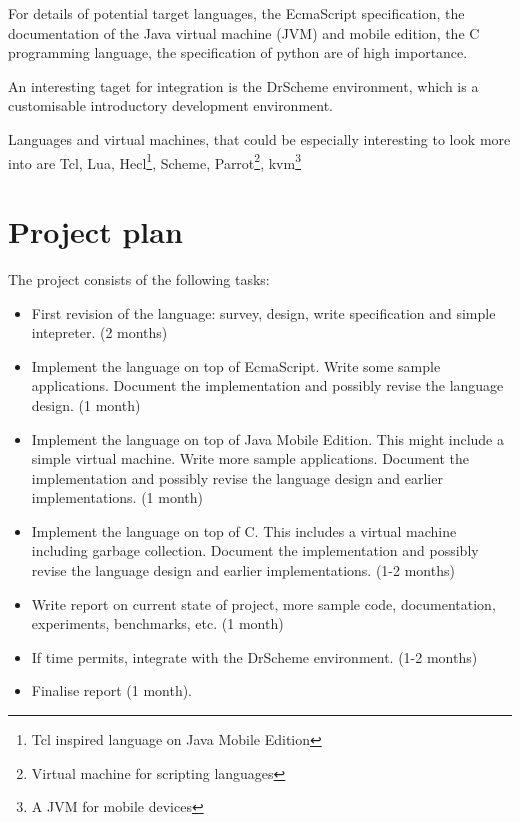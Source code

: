 \documentclass[12pt]{article}
\begin{document}
For details of potential target languages, the EcmaScript specification\cite{ecma262}, the documentation of the 
Java virtual machine (JVM)\cite{jvm}  
and mobile edition\cite{j2me}, 
the C programming language\cite{knr}, 
the specification of python\cite{python} are of high importance. 

An interesting taget for integration is the DrScheme environment\cite{drscheme}, which is a customisable introductory development environment.

Languages and virtual machines, that could be especially interesting to look more into are Tcl\cite{tcl-tk}, 
Lua\cite{lua5}, 
Hecl\footnote{Tcl inspired language on Java Mobile Edition}\cite{Hecl}, 
Scheme\cite{r6rs}, 
Parrot\footnote{Virtual machine for scripting languages}\cite{parrot}, 
kvm\footnote{A JVM for mobile devices}\cite{kvm}


\section{Project plan}

The project consists of the following tasks:
\begin{itemize}
\item First revision of the language: survey, design, write specification and simple intepreter. (2 months)
\item Implement the language on top of EcmaScript. Write some sample applications. Document the implementation and possibly revise the language design. (1 month)
\item Implement the language on top of Java Mobile Edition. This might include a simple virtual machine. Write more sample applications. Document the implementation and possibly revise the language design and earlier implementations. (1 month)
\item Implement the language on top of C. This includes a virtual machine including garbage collection. Document the implementation and possibly revise the language design and earlier implementations. (1-2 months)
\item Write report on current state of project, more sample code, documentation, experiments, benchmarks, etc. (1 month)
\item If time permits, integrate with the DrScheme environment. (1-2 months)
\item Finalise report (1 month).
\end{itemize}
\end{document}
